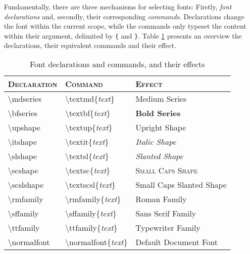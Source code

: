 \documentclass[a4paper,oneside,11pt]{article}
\begin{document}
Fundamentally,  there  are  three  mechanisms  for  selecting  fonts: Firstly,
\emph{font     declarations}     and,    secondly,     their     corresponding
\emph{commands}. Declarations change the font  within the current scope, while
the  commands only  typeset the  content within  their argument,  delimited by
\verb|{| and \verb|}|. Table \ref{tab:font-decs-cmds} presents an overview the
declarations, their equivalent commands and their effect.

\begin{table}[h!]
    \centering
    \caption{Font declarations and commands, and their effects}
    \vspace{0.5em}
    \label{tab:font-decs-cmds}
    \begin{tabular}{>{\ttfamily}l<{\normalfont} >{\ttfamily}l<{\normalfont} l}
        \toprule
        \normalfont\scshape Declaration & \normalfont\scshape Command  & \scshape Effect \\
        \midrule
        \textbackslash{}mdseries   & \textbackslash{}textmd\{\textit{text}\}     & \mdseries Medium Series             \\
        \textbackslash{}bfseries   & \textbackslash{}textbf\{\textit{text}\}     & \bfseries Bold Series               \\
        \textbackslash{}upshape    & \textbackslash{}textup\{\textit{text}\}     & \upshape Upright Shape              \\
        \textbackslash{}itshape    & \textbackslash{}textit\{\textit{text}\}     & \itshape Italic Shape               \\
        \textbackslash{}slshape    & \textbackslash{}textsl\{\textit{text}\}     & \slshape Slanted Shape              \\
        \textbackslash{}scshape    & \textbackslash{}textsc\{\textit{text}\}     & \scshape Small Caps Shape           \\
        \textbackslash{}scslshape  & \textbackslash{}textscsl\{\textit{text}\}   & \scslshape Small Caps Slanted Shape \\
        \textbackslash{}rmfamily   & \textbackslash{}rmfamily\{\textit{text}\}   & \rmfamily Roman Family              \\
        \textbackslash{}sffamily   & \textbackslash{}sffamily\{\textit{text}\}   & \sffamily Sans Serif Family         \\
        \textbackslash{}ttfamily   & \textbackslash{}ttfamily\{\textit{text}\}   & \ttfamily Typewriter Family         \\
        \textbackslash{}normalfont & \textbackslash{}normalfont\{\textit{text}\} & \normalfont Default Document Font   \\
        \bottomrule
    \end{tabular}
\end{table}
\end{document}

